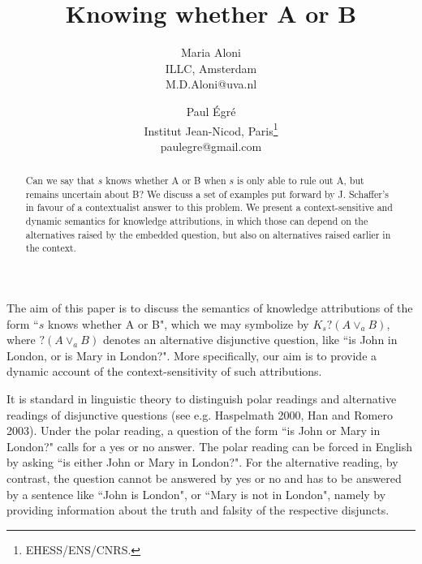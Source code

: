 \documentclass[times,10pt,twocolumn]{article}
\begin{document}
\title{Knowing whether A or B}

\author{Maria Aloni\\
ILLC, Amsterdam \\M.D.Aloni@uva.nl\\
\and
Paul \'Egr\'e   \\
Institut Jean-Nicod, Paris\footnote{EHESS/ENS/CNRS.}\\
paulegre@gmail.com\\
}

\maketitle \thispagestyle{empty}

\begin{abstract}

Can we say that $s$ knows whether A or B when $s$ is only able to
rule out A, but remains uncertain about B? We discuss a set of
examples put forward by J. Schaffer's in favour of a contextualist
answer to this problem. We present a context-sensitive and dynamic
semantics for knowledge attributions, in which those can depend on
the alternatives raised by the embedded question, but also on
alternatives raised earlier in the context.

\end{abstract}



The aim of this paper is to discuss the semantics of knowledge
attributions of the form ``$s$ knows whether A or B", which we may
symbolize by $K_{s} ?(A\vee_{a} B)$, where $?(A \vee_{a} B)$
denotes an alternative disjunctive question, like ``is John in
London, or is Mary in London?". More specifically, our aim is to
provide a dynamic account of the context-sensitivity of such
attributions.

It is standard in linguistic theory to distinguish polar readings
and alternative readings of disjunctive questions (see e.g.
Haspelmath 2000, Han and Romero 2003). Under the polar reading, a
question of the form ``is John or Mary in London?" calls for a yes
or no answer. The polar reading can be forced in English by asking
``is either John or Mary in London?". For the alternative reading,
by contrast, the question cannot be answered by yes or no and has
to be answered by a sentence like ``John is London", or ``Mary is
not in London", namely by providing information about the truth
and falsity of the respective disjuncts.
\end{document}
